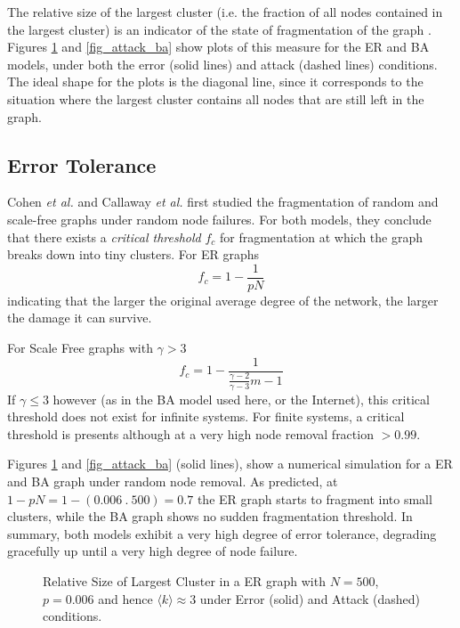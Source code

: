 \documentclass{article}
\begin{document}
The relative size of the largest cluster (i.e. the fraction of all nodes contained in the largest cluster) is an indicator of the state of fragmentation of the graph \cite{barabasi_network}.
Figures \ref{fig_attack_er} and \ref{fig_attack_ba} show plots of this measure for the ER and BA models, under both the error (solid lines) and attack (dashed lines) conditions.
The ideal shape for the plots is the diagonal line, since it corresponds to the situation where the largest cluster contains all nodes that are still left in the graph.

\subsection{Error Tolerance}
Cohen {\it et al.} \cite{cohen} and Callaway {\it et al.} \cite{callaway} first studied the fragmentation of random and scale-free graphs under random node failures.
For both models, they conclude that there exists a {\it critical threshold} $f_c$ for fragmentation at which the graph breaks down into tiny clusters.
For ER graphs
$$
    f_c = 1 - \frac{1}
                   {pN}
$$
indicating that the larger the original average degree of the network, the larger the damage it can survive.

For Scale Free graphs with  $\gamma > 3$
$$
   f_c = 1 - \frac{1}
                  {
                    \frac{\gamma - 2}
                         {\gamma - 3}m -1
                  }
$$
If $\gamma \leq 3$ however (as in the BA model used here, or the Internet), this critical threshold does not exist for infinite systems.
For finite systems, a critical threshold is presents although at a very high node removal fraction $>0.99$.

Figures \ref{fig_attack_er} and \ref{fig_attack_ba} (solid lines), show a numerical simulation for a ER and BA graph under random node removal.
As predicted, at $1-pN = 1-(0.006~.~500) = 0.7$ the ER graph starts to fragment into small clusters, while the BA graph shows no sudden fragmentation threshold.
In summary, both models exhibit a very high degree of error tolerance, degrading gracefully up until a very high degree of node failure.

\begin{figure}[htp]
   \centerline{
              } 
   \caption{Relative Size of Largest Cluster in a ER graph with $N=500$, $p=0.006$ and hence $\langle k \rangle \approx 3$ under Error (solid) and Attack (dashed) conditions.}
   \label{fig_attack_er}
\end{figure}
\end{document}
